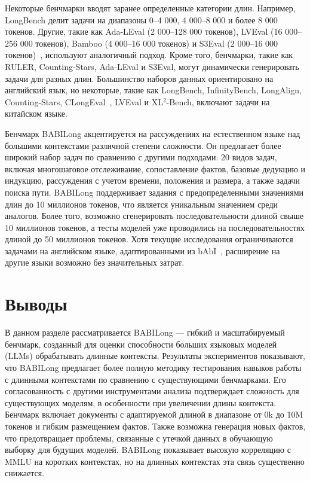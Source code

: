 Некоторые бенчмарки вводят заранее определенные категории длин. Например, LongBench делит задачи на диапазоны 0–4 000, 4 000–8 000 и более 8 000 токенов. Другие, такие как Ada-LEval (2 000–128 000 токенов), LVEval (16 000–256 000 токенов), Bamboo (4 000–16 000 токенов) и S3Eval (2 000–16 000 токенов)~\cite{lei2023s3eval}, используют аналогичный подход. Кроме того, бенчмарки, такие как RULER, Counting-Stars, Ada-LEval и S3Eval, могут динамически генерировать задачи для разных длин. Большинство наборов данных ориентировано на английский язык, но некоторые, такие как LongBench, InfinityBench, LongAlign, Counting-Stars, CLongEval~\cite{qiu2024clongeval}, LVEval и XL$^2$-Bench, включают задачи на китайском языке.

Бенчмарк BABILong акцентируется на рассуждениях на естественном языке над большими контекстами различной степени сложности. Он предлагает более широкий набор задач по сравнению с другими подходами: 20 видов задач, включая многошаговое отслеживание, сопоставление фактов, базовые дедукцию и индукцию, рассуждения с учетом времени, положения и размера, а также задачи поиска пути. BABILong поддерживает задания с предопределенными значениями длин до 10 миллионов токенов, что является уникальным значением среди аналогов. Более того, возможно сгенерировать последовательности длиной свыше 10 миллионов токенов, а тесты моделей уже проводились на последовательностях длиной до 50 миллионов токенов. Хотя текущие исследования ограничиваются задачами на английском языке, адаптированными из bAbI~\cite{WestonBCM15}, расширение на другие языки возможно без значительных затрат. 


\section*{Выводы}

В данном разделе рассматривается BABILong — гибкий и масштабируемый бенчмарк, созданный для оценки способности больших языковых моделей (LLMs) обрабатывать длинные контексты. Результаты экспериментов показывают, что BABILong предлагает более полную методику тестирования навыков работы с длинными контекстами по сравнению с существующими бенчмарками. Его согласованность с другими инструментами анализа подтверждает сложность для существующих моделям, в особенности при увеличении длины контекста. Бенчмарк включает документы с адаптируемой длиной в диапазоне от 0k до 10M токенов и гибким размещением фактов. Также возможна генерация новых фактов, что предотвращает проблемы, связанные с утечкой данных в обучающую выборку для будущих моделей. BABILong показывает высокую корреляцию с MMLU на коротких контекстах, но на длинных контекстах эта связь существенно снижается.

